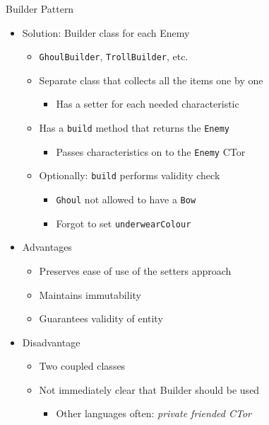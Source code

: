 \begin{frame}[fragile]{Builder Pattern}
%
\vspace{-3pt}
\begin{itemize}
\item Solution: Builder class for each Enemy
	\begin{itemize}
	\item \texttt{GhoulBuilder}, \texttt{TrollBuilder}, etc.
	\item Separate class that collects all the items one by one
		\begin{itemize}
		\item Has a setter for each needed characteristic
		\end{itemize}
	\item Has a \texttt{build} method that returns the \texttt{Enemy}
		\begin{itemize}
		\item Passes characteristics on to the \texttt{Enemy} CTor
		\end{itemize}
	\item Optionally: \texttt{build} performs validity check 
		\begin{itemize}
		\item \texttt{Ghoul} not allowed to have a \texttt{Bow}
		\item Forgot to set \texttt{underwearColour}
		\end{itemize}
	\end{itemize}
\pause
\item Advantages
	\begin{itemize}
	\item Preserves ease of use of the setters approach
	\item Maintains immutability
	\item Guarantees validity of entity
	\end{itemize}
\pause
\item Disadvantage
	\begin{itemize}
	\item Two coupled classes
	\item Not immediately clear that Builder should be used
		\begin{itemize}
		\item Other languages often: \emph{private friended CTor}
		\end{itemize}
	\end{itemize}
\end{itemize}
%
\end{frame}

